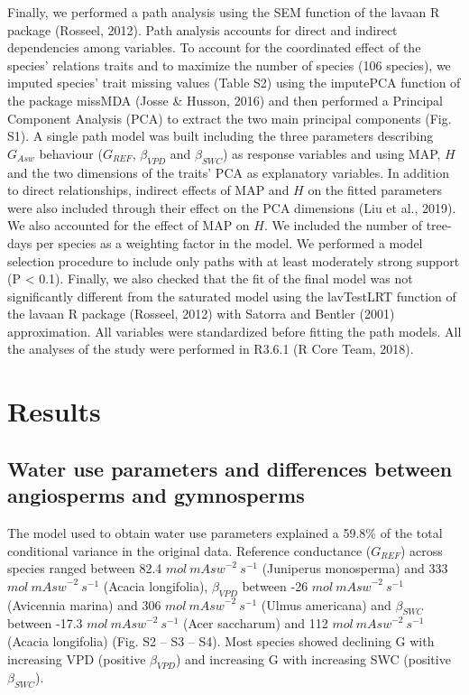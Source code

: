 \documentclass[11pt,twoside]{reedthesis}
\begin{document}
Finally, we performed a path analysis using the SEM function of the
lavaan R package (Rosseel, 2012). Path analysis accounts for direct and
indirect dependencies among variables. To account for the coordinated
effect of the species' relations traits and to maximize the number of
species (106 species), we imputed species' trait missing values (Table
S2) using the imputePCA function of the package missMDA (Josse \&
Husson, 2016) and then performed a Principal Component Analysis (PCA) to
extract the two main principal components (Fig. S1). A single path model
was built including the three parameters describing \(G_{Asw}\)
behaviour (\(G_{REF}\), \(\beta_{VPD}\) and \(\beta_{SWC}\)) as response
variables and using MAP, \(H\) and the two dimensions of the traits' PCA
as explanatory variables. In addition to direct relationships, indirect
effects of MAP and \(H\) on the fitted parameters were also included
through their effect on the PCA dimensions (Liu et al., 2019). We also
accounted for the effect of MAP on \(H\). We included the number of
tree-days per species as a weighting factor in the model. We performed a
model selection procedure to include only paths with at least moderately
strong support (P \textless{} 0.1). Finally, we also checked that the
fit of the final model was not significantly different from the
saturated model using the lavTestLRT function of the lavaan R package
(Rosseel, 2012) with Satorra and Bentler (2001) approximation. All
variables were standardized before fitting the path models. All the
analyses of the study were performed in R3.6.1 (R Core Team, 2018).\par

\section{Results}\label{results}

\subsection{Water use parameters and differences between angiosperms and
gymnosperms}\label{water-use-parameters-and-differences-between-angiosperms-and-gymnosperms}

The model used to obtain water use parameters explained a 59.8\% of the
total conditional variance in the original data. Reference conductance
(\(G_{REF}\)) across species ranged between 82.4
\(mol\: m{Asw}^{-2}\: s^{-1}\) (Juniperus monosperma) and 333
\(mol\: m{Asw}^{-2}\: s^{-1}\) (Acacia longifolia), \(\beta_{VPD}\)
between -26 \(mol\: m{Asw}^{-2}\: s^{-1}\) (Avicennia marina) and 306
\(mol\: m{Asw}^{-2}\: s^{-1}\) (Ulmus americana) and \(\beta_{SWC}\)
between -17.3 \(mol\: m{Asw}^{-2}\: s^{-1}\) (Acer saccharum) and 112
\(mol\: m{Asw}^{-2}\: s^{-1}\) (Acacia longifolia) (Fig. S2 -- S3 --
S4). Most species showed declining G with increasing VPD (positive
\(\beta_{VPD}\)) and increasing G with increasing SWC (positive
\(\beta_{SWC}\)).\par
\end{document}
